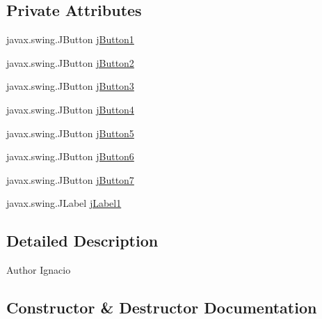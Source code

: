 \subsection*{Private Attributes}
\begin{DoxyCompactItemize}
\item 
javax.\+swing.\+J\+Button \mbox{\hyperlink{classinterfacessoguar_1_1presoscu07_a32fac137cfd5dc354e4cfa6ee0530f76}{j\+Button1}}
\item 
javax.\+swing.\+J\+Button \mbox{\hyperlink{classinterfacessoguar_1_1presoscu07_a35492e43d1e9d8728a881acf30bff4c3}{j\+Button2}}
\item 
javax.\+swing.\+J\+Button \mbox{\hyperlink{classinterfacessoguar_1_1presoscu07_ab74517a901b30e28dab9f184845d8e00}{j\+Button3}}
\item 
javax.\+swing.\+J\+Button \mbox{\hyperlink{classinterfacessoguar_1_1presoscu07_a59d84610b52e55806c464f05ac4d1f9a}{j\+Button4}}
\item 
javax.\+swing.\+J\+Button \mbox{\hyperlink{classinterfacessoguar_1_1presoscu07_a235597181f1514e6ad0aa24146a9ea4a}{j\+Button5}}
\item 
javax.\+swing.\+J\+Button \mbox{\hyperlink{classinterfacessoguar_1_1presoscu07_a43f487b75785b57a2b918d23dfc94611}{j\+Button6}}
\item 
javax.\+swing.\+J\+Button \mbox{\hyperlink{classinterfacessoguar_1_1presoscu07_a3f67db575069b29512c7ce7b0f2e8062}{j\+Button7}}
\item 
javax.\+swing.\+J\+Label \mbox{\hyperlink{classinterfacessoguar_1_1presoscu07_a085ba36143328d4629072e229e1b5acb}{j\+Label1}}
\end{DoxyCompactItemize}


\subsection{Detailed Description}
\begin{DoxyAuthor}{Author}
Ignacio 
\end{DoxyAuthor}


\subsection{Constructor \& Destructor Documentation}
\mbox{\label{classinterfacessoguar_1_1presoscu07_ae655471017f46460a1310a594fec8065}} 

